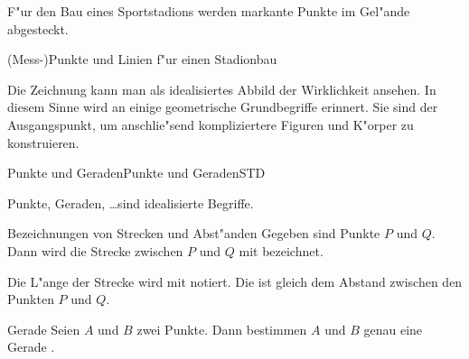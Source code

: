 \begin{MIntro}

F"ur den Bau eines Sportstadions werden markante Punkte im Gel"ande abgesteckt.


\begin{center}
(Mess-)Punkte und Linien f"ur einen Stadionbau
\end{center}

Die Zeichnung kann man als idealisiertes Abbild der Wirklichkeit ansehen.
In diesem Sinne wird an einige geometrische Grundbegriffe erinnert. Sie sind 
der Ausgangspunkt, um anschlie"send kompliziertere Figuren und K"orper zu 
konstruieren.
\end{MIntro}

\begin{MXContent}{Punkte und Geraden}{Punkte und Geraden}{STD}

Punkte, Geraden, \ldots sind idealisierte Begriffe.

\begin{MXInfo}{Bezeichnungen von Strecken und Abst"anden}
Gegeben sind Punkte $P$ und $Q$. Dann wird die Strecke zwischen $P$ und $Q$ mit
 bezeichnet.

Die L"ange der Strecke  wird mit  notiert.
Die  ist gleich dem Abstand zwischen den
Punkten $P$ und $Q$.
\end{MXInfo}

\begin{MXInfo}{Gerade}
Seien $A$ und $B$ zwei Punkte. Dann bestimmen $A$ und $B$ genau eine Gerade 
.
\end{MXInfo}

\end{MXContent}


